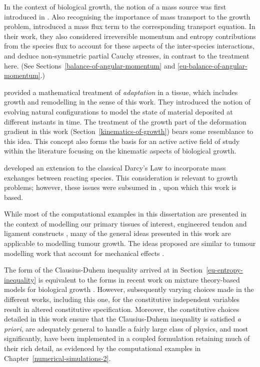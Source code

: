 In the context of biological growth, the notion of a mass source was
first introduced in \citet{CowinHegedus:76}. Also recognising the
importance of mass transport to the growth problem,
\citet{EpsteinMaugin:2000} introduced a mass flux term to the
corresponding transport equation. In their work, they also considered
irreversible momentum and entropy contributions from the species flux
to account for these aspects of the inter-species interactions, and
deduce non-symmetric partial Cauchy stresses, in contrast to the
treatment here. (See Sections~\ref{balance-of-angular-momentum} and
\ref{eu-balance-of-angular-momentum}.)

\citet{HumphreyRajagopal:02} provided a mathematical treatment of
\emph{adaptation} in a tissue, which includes growth and remodelling
in the sense of this work. They introduced the notion of evolving
natural configurations to model the state of material deposited at
different instants in time. The treatment of the growth part of the
deformation gradient in this work (Section~\ref{kinematics-of-growth})
bears some resemblance to this idea. This concept also forms the basis
for an active active field of study within the literature
\citep{Skalak:81, SkalakHoger:96, Klischetal:2001, TaberHumphrey:2001,
  LubardaHoger:02, AmbrosiMollica:2002} focusing on the kinematic
aspects of biological growth.

\citet{PreziosiFarina:2002} developed an extension to the classical
Darcy's Law to incorporate mass exchanges between reacting
species. This consideration is relevant to growth problems; however,
these issues were subsumed in \citet{growthpaper}, upon which this
work is based.

While most of the computational examples in this dissertation are
presented in the context of modelling our primary tissues of interest,
engineered tendon and ligament constructs
\citep{Calve:04,Syed-Picard:06}, many of the general ideas presented
in this work are applicable to modelling tumour growth. The ideas
proposed are similar to tumour modelling work that account for
mechanical effects \citep{Jackson-Byrne:02,Byrneetal:06}.

The form of the Clausius-Duhem inequality arrived at in
Section~\ref{eu-entropy-inequality} is equivalent to the forms in
recent work on mixture theory-based models for biological growth
\citep{loret05, ateshian07}. However, subsequently varying choices
made in the different works, including this one, for the constitutive
independent variables result in altered constitutive
specification. Moreover, the constitutive choices detailed in this
work ensure that the Clausius-Duhem inequality is satisfied {\em a
  priori}, are adequately general to handle a fairly large class of
physics, and most significantly, have been implemented in a coupled
formulation retaining much of their rich detail, as evidenced by the
computational examples in Chapter~\ref{numerical-simulations-2}.

